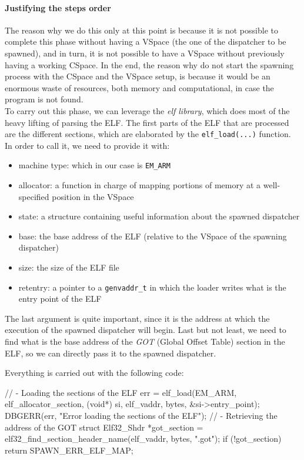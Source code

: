 \documentclass[a4paper,twoside,openright]{report}
\begin{document}
\paragraph{Justifying the steps order}
The reason why we do this only at this point is because it is not possible to complete this phase without having a VSpace (the one of the dispatcher to be spawned), and in turn, it is not possible to have a VSpace without previously having a working CSpace.
In the end, the reason why do not start the spawning process with the CSpace and the VSpace setup, is because it would be an enormous waste of resources, both memory and computational, in case the program is not found.\\

To carry out this phase, we can leverage the \emph{elf library}, which does most of the heavy lifting of parsing the ELF. 
The first parts of the ELF that are processed are the different sections, which are elaborated by the \texttt{elf\_load(...)} function.
In order to call it, we need to provide it with:
\begin{itemize}
    \item machine type: which in our case is \texttt{EM\_ARM}
    \item allocator: a function in charge of mapping portions of memory at a well-specified position in the VSpace
    \item state: a structure containing useful information about the spawned dispatcher
    \item base: the base address of the ELF (relative to the VSpace of the spawning dispatcher)
    \item size: the size of the ELF file
    \item retentry: a pointer to a \texttt{genvaddr\_t} in which the loader writes what is the entry point of the ELF
\end{itemize}

The last argument is quite important, since it is the address at which the execution of the spawned dispatcher will begin.
Last but not least, we need to find what is the base address of the \emph{GOT} (Global Offset Table) section in the ELF, so we can directly pass it to the spawned dispatcher.

Everything is carried out with the following code:
\begin{pandacode}
    // - Loading the sections of the ELF
    err = elf_load(EM_ARM, elf_allocator_section, (void*) si, elf_vaddr,
                    bytes, &si->entry_point);
    DBGERR(err, "Error loading the sections of the ELF");
    // - Retrieving the address of the GOT
    struct Elf32_Shdr *got_section = elf32_find_section_header_name(elf_vaddr, bytes, ".got");
    if (!got_section) {
        return SPAWN_ERR_ELF_MAP;
    }
\end{pandacode}
\end{document}
